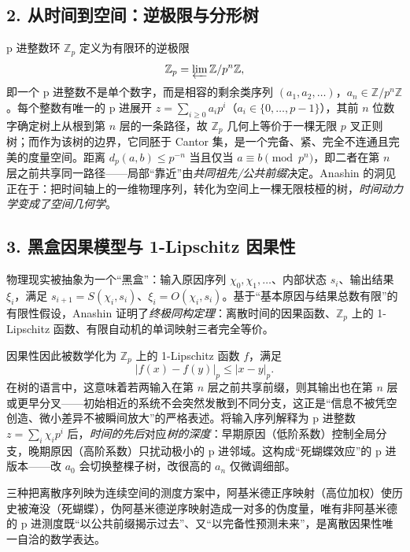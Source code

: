 ﻿\documentclass[10pt,a4paper]{article}
\numberwithin{equation}{section}
\begin{document}
\subsection*{2. 从时间到空间：逆极限与分形树}

p 进整数环 $\mathbb{Z}_{p}$ 定义为有限环的逆极限
\begin{equation}
    \mathbb{Z}_{p}=\varprojlim \mathbb{Z}/p^{n}\mathbb{Z},
\end{equation}
即一个 p 进整数不是单个数字，而是相容的剩余类序列 $(a_{1},a_{2},\dots)$，$a_{n}\in\mathbb{Z}/p^{n}\mathbb{Z}$。每个整数有唯一的 p 进展开 $z=\sum_{i\ge 0}a_{i}p^{i}$（$a_{i}\in\{0,\dots,p-1\}$），其前 $n$ 位数字确定树上从根到第 $n$ 层的一条路径，故 $\mathbb{Z}_{p}$ 几何上等价于一棵无限 $p$ 叉正则树；而作为该树的边界，它同胚于 Cantor 集，是一个完备、紧、完全不连通且完美的度量空间。距离 $d_{p}(a,b)\le p^{-n}$ 当且仅当 $a\equiv b\pmod{p^{n}}$，即二者在第 $n$ 层之前共享同一路径——局部“靠近”由\emph{共同祖先/公共前缀}决定。Anashin 的洞见正在于：把时间轴上的一维物理序列，转化为空间上一棵无限枝桠的树，\emph{时间动力学变成了空间几何学}。

\subsection*{3. 黑盒因果模型与 1-Lipschitz 因果性}

物理现实被抽象为一个“黑盒”：输入原因序列 $\chi_{0},\chi_{1},\dots$、内部状态 $s_{i}$、输出结果 $\xi_{i}$，满足 $s_{i+1}=S(\chi_{i},s_{i})$、$\xi_{i}=O(\chi_{i},s_{i})$。基于“基本原因与结果总数有限”的有限性假设，Anashin 证明了\emph{终极同构定理}：离散时间的因果函数、$\mathbb{Z}_{p}$ 上的 1-Lipschitz 函数、有限自动机的单词映射三者完全等价。

因果性因此被数学化为 $\mathbb{Z}_{p}$ 上的 1-Lipschitz 函数 $f$，满足
\begin{equation}
    |f(x)-f(y)|_{p}\le |x-y|_{p}.
\end{equation}
在树的语言中，这意味着若两输入在第 $n$ 层之前共享前缀，则其输出也在第 $n$ 层或更早分叉——初始相近的系统不会突然发散到不同分支，这正是“信息不被凭空创造、微小差异不被瞬间放大”的严格表述。将输入序列解释为 p 进整数 $z=\sum_{i}\chi_{i}p^{i}$ 后，\emph{时间的先后}对应\emph{树的深度}：早期原因（低阶系数）控制全局分支，晚期原因（高阶系数）只扰动极小的 p 进邻域。这构成“死蝴蝶效应”的 p 进版本——改 $a_{0}$ 会切换整棵子树，改很高的 $a_{n}$ 仅微调细部。

三种把离散序列映为连续空间的测度方案中，阿基米德正序映射（高位加权）使历史被淹没（死蝴蝶），伪阿基米德逆序映射造成一对多的伪度量，唯有非阿基米德的 p 进测度既“以公共前缀揭示过去”、又“以完备性预测未来”，是离散因果性唯一自洽的数学表达。
\end{document}
